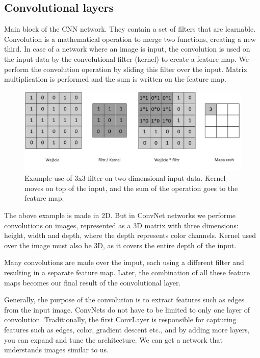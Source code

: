 \documentclass[conference]{IEEEtran}
\begin{document}
\subsection{Convolutional layers}
Main block of the CNN network. They contain a set of filters that are learnable. Convolution is a mathematical operation to merge two functions, creating a new third. In case of a network where an image is input, the convolution is used on the input data by the convolutional filter (kernel) to create a feature map.
We perform the convolution operation by sliding this filter over the input. Matrix multiplication is performed and the sum is written on the feature map.

\begin{figure}[hbt!]
 \centering
    \includegraphics[scale=0.24]{kernel-b.png}
	    \caption{Example use of 3x3 filter on two dimensional input data. Kernel moves on top of the input, and the sum of the operation goes to the feature map.}
	    \label{fig:my_label}
\end{figure}

The above example is made in 2D. But in ConvNet networks we performe convolutions on images, represented as a 3D matrix with three dimensions: height, width and depth, where the depth represents color channels. Kernel used over the image must also be 3D, as it covers the entire depth of the input.

Many convolutions are made over the imput, each using a different filter and resulting in a separate feature map. Later, the combination of all these feature maps becomes our final result of the convolutional layer.

Generally, the purpose of the convolution is to extract features such as edges from the input image. ConvNets do not have to be limited to only one layer of convolution. Traditionally, the first ConvLayer is responsible for capturing features such as edges, color, gradient descent etc., and by adding more layers, you can expand and tune the architecture. We can get a network that understands images similar to us.
\end{document}
